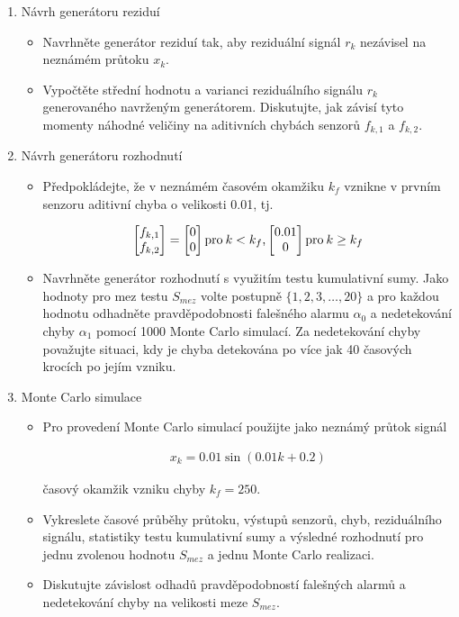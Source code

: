 \begin{enumerate}
    \item Návrh generátoru reziduí
    
    \begin{itemize}
        \item Navrhněte generátor reziduí tak, aby reziduální signál \( r_k \) nezávisel na neznámém průtoku \( x_k \).
        
        \item Vypočtěte střední hodnotu a varianci reziduálního signálu \( r_k \) generovaného navrženým generátorem. Diskutujte, jak závisí tyto momenty náhodné veličiny na aditivních chybách senzorů \( f_{k, 1} \) a \( f_{k, 2} \).
    \end{itemize}
    
    \item Návrh generátoru rozhodnutí
    
    \begin{itemize}
        \item Předpokládejte, že v neznámém časovém okamžiku \( k_f \) vznikne v prvním senzoru aditivní chyba o velikosti 0.01, tj.
        
        \begin{align}
            \begin{bmatrix} {f}_{k, 1}\\ {f}_{k, 2} \end{bmatrix} = \begin{bmatrix} {0}\\ {0} \end{bmatrix} \text{pro} \: k < k_f \text{,} \begin{bmatrix} {0.01}\\ {0} \end{bmatrix} \text{pro} \: k \geq k_f
        \end{align}
        
        \item Navrhněte generátor rozhodnutí s využitím testu kumulativní sumy. Jako hodnoty pro mez testu \( S_{mez} \) volte postupně \( \{1, 2, 3,\ldots, 20\} \) a pro každou hodnotu odhadněte pravděpodobnosti falešného alarmu \( \alpha_0 \) a nedetekování chyby \( \alpha_1 \) pomocí 1000 Monte Carlo simulací. Za nedetekování chyby považujte situaci, kdy je chyba detekována po více jak 40 časových krocích po jejím vzniku.
    \end{itemize}
    
    \item Monte Carlo simulace
    
    \begin{itemize}
        \item Pro provedení Monte Carlo simulací použijte jako neznámý průtok signál 
        
        \begin{align}
            x_k = 0.01 \sin{(0.01 k + 0.2)}
        \end{align}
        
        časový okamžik vzniku chyby \( k_f = 250 \).
        
        \item Vykreslete časové průběhy průtoku, výstupů senzorů, chyb, reziduálního signálu, statistiky testu kumulativní sumy a výsledné rozhodnutí pro jednu zvolenou hodnotu \( S_{mez} \) a jednu Monte Carlo realizaci. 
        
        \item Diskutujte závislost odhadů pravděpodobností falešných alarmů a nedetekování chyby na velikosti meze \( S_{mez} \).
    \end{itemize}
\end{enumerate}
